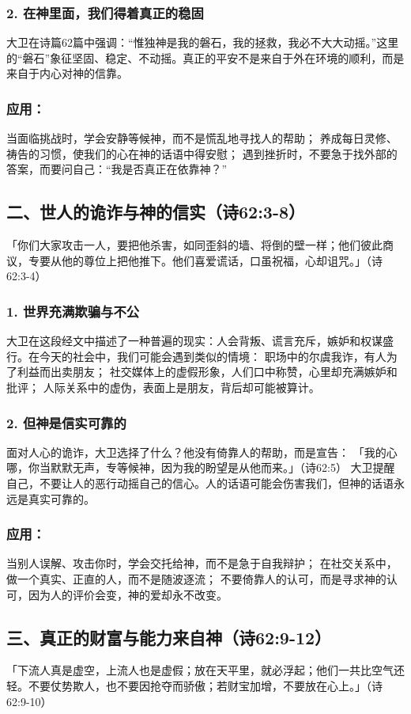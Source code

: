 \documentclass[a4paper, 12pt]{article}
\begin{document}
\subsubsection*{2. 在神里面，我们得着真正的稳固}
大卫在诗篇62篇中强调：“惟独神是我的磐石，我的拯救，我必不大大动摇。”这里的“磐石”象征坚固、稳定、不动摇。真正的平安不是来自于外在环境的顺利，而是来自于内心对神的信靠。
\subsubsection*{应用：}
当面临挑战时，学会安静等候神，而不是慌乱地寻找人的帮助；
养成每日灵修、祷告的习惯，使我们的心在神的话语中得安慰；
遇到挫折时，不要急于找外部的答案，而要问自己：“我是否真正在依靠神？”
\subsection*{二、世人的诡诈与神的信实（诗62:3-8）}
「你们大家攻击一人，要把他杀害，如同歪斜的墙、将倒的壁一样；他们彼此商议，专要从他的尊位上把他推下。他们喜爱谎话，口虽祝福，心却诅咒。」（诗62:3-4）
\subsubsection*{1. 世界充满欺骗与不公}
大卫在这段经文中描述了一种普遍的现实：人会背叛、谎言充斥，嫉妒和权谋盛行。在今天的社会中，我们可能会遇到类似的情境：
职场中的尔虞我诈，有人为了利益而出卖朋友；
社交媒体上的虚假形象，人们口中称赞，心里却充满嫉妒和批评；
人际关系中的虚伪，表面上是朋友，背后却可能被算计。
\subsubsection*{2. 但神是信实可靠的}
面对人心的诡诈，大卫选择了什么？他没有倚靠人的帮助，而是宣告：
「我的心哪，你当默默无声，专等候神，因为我的盼望是从他而来。」（诗62:5）
大卫提醒自己，不要让人的恶行动摇自己的信心。人的话语可能会伤害我们，但神的话语永远是真实可靠的。
\subsubsection*{应用：}
当别人误解、攻击你时，学会交托给神，而不是急于自我辩护；
在社交关系中，做一个真实、正直的人，而不是随波逐流；
不要倚靠人的认可，而是寻求神的认可，因为人的评价会变，神的爱却永不改变。
\subsection*{三、真正的财富与能力来自神（诗62:9-12）}
「下流人真是虚空，上流人也是虚假；放在天平里，就必浮起；他们一共比空气还轻。不要仗势欺人，也不要因抢夺而骄傲；若财宝加增，不要放在心上。」（诗62:9-10）
\end{document}
